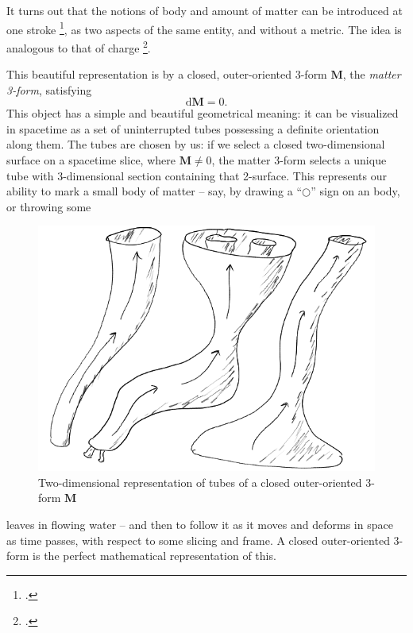 \documentclass[\ifafour a4paper,12pt,\else a5paper,10pt,\fi%
onecolumn,oneside,article,%
british%
]{memoir}
\theoremstyle{remark}
\theoremstyle{innote}
\newcommand*{\citep}{\footcites}
\newcommand*{\di}{\mathrm{d}}%
\renewcommand*{\|}[1][]{\nonscript\,#1\vert\nonscript\;\mathopen{}}
\newcommand*{\sect}{\S}%
\newcommand*{\cf}{{cf.}}
\newcommand*{\yrr}{M}
\newcommand*{\yr}{\bm{\yrr}}
\begin{document}
It turns out that the notions of body and amount of matter can be
introduced at one stroke \citep[\cf][]{carteretal1972}, as two aspects of
the same entity, and without a metric. The idea is analogous to that of
charge
\citep{burke1983,bossavit1998b,hehletal2000}[\sect~B.1]{hehletal2003}.

This beautiful representation is by a closed, outer-oriented 3-form $\yr$,
the \emph{matter 3-form}, satisfying
\begin{equation}
  \label{eq:mass_density_closed_three_form}
  \di\yr=0.
\end{equation}
This object has a simple and beautiful geometrical meaning: it can be
visualized in spacetime as a set of uninterrupted tubes possessing a
definite orientation along them. The tubes are chosen by us: if we select a
closed two-dimensional surface on a spacetime slice, where $\yr \ne 0$, the
matter 3-form selects a unique tube with 3-dimensional section containing
that 2-surface. This represents our ability to mark a small
body of matter -- say, by drawing a \enquote{$\mathord{\bigcirc}$} sign on
an body, or throwing some %
\setlength{\intextsep}{0.0ex}%
\begin{figure}
  \includegraphics[width=\linewidth]{mass_tubes2.png}\\
  \centering\footnotesize Two-dimensional representation of tubes of a
  closed outer-oriented 3-form $\yr$
\end{figure}
leaves in flowing water -- and then to follow it
as it moves and deforms %
in space as time passes, with respect to some
slicing and frame. A closed %
outer-oriented 3-form is the perfect
mathematical representation of this.
\end{document}
